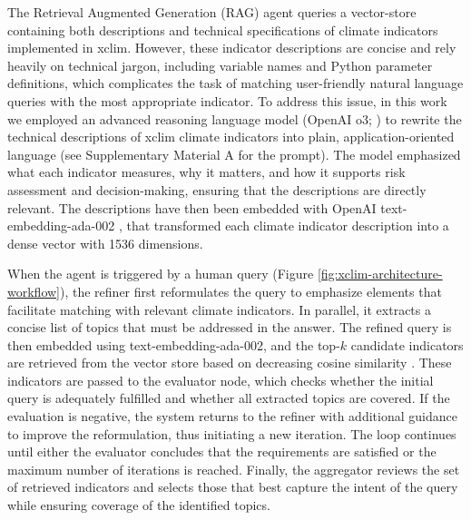 The Retrieval Augmented Generation (RAG) agent queries a vector-store containing both descriptions and technical specifications of climate indicators implemented in xclim. 
However, these indicator descriptions are concise and rely heavily on technical jargon, including variable names and Python parameter definitions, which complicates the task of matching user-friendly natural language queries with the most appropriate indicator. 
To address this issue, in this work we employed an advanced reasoning language model (OpenAI o3; \citet{openai_introducing_2025}) to rewrite the technical descriptions of xclim climate indicators into plain, application-oriented language (see Supplementary Material A for the prompt). 
The model emphasized what each indicator measures, why it matters, and how it supports risk assessment and decision-making, ensuring that the descriptions are directly relevant. The descriptions have then been embedded with OpenAI text-embedding-ada-002 \citep{openai_text-embedding-ada-002_2022}, that transformed each climate indicator description into a dense vector with 1536 dimensions.

When the agent is triggered by a human query (Figure \ref{fig:xclim-architecture-workflow}), the refiner first reformulates the query to emphasize elements that facilitate matching with relevant climate indicators. In parallel, it extracts a concise list of topics that must be addressed in the answer. The refined query is then embedded using text-embedding-ada-002, and the top-$k$ candidate indicators are retrieved from the vector store based on decreasing cosine similarity \citep{salton_developments_1991}. These indicators are passed to the evaluator node, which checks whether the initial query is adequately fulfilled and whether all extracted topics are covered. If the evaluation is negative, the system returns to the refiner with additional guidance to improve the reformulation, thus initiating a new iteration. The loop continues until either the evaluator concludes that the requirements are satisfied or the maximum number of iterations is reached. Finally, the aggregator reviews the set of retrieved indicators and selects those that best capture the intent of the query while ensuring coverage of the identified topics.

